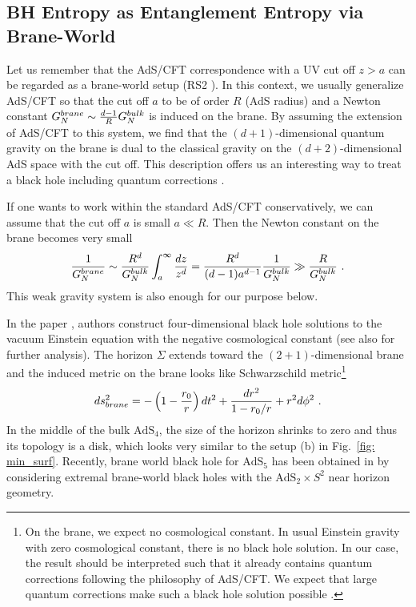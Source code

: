\documentclass[12pt]{article}
\def\frac#1#2{{#1\over #2}}
\def\f {\frac}
\def\frac#1#2{{#1\over #2}}
\def\be{\begin{equation}}
\def\ee{\end{equation}}
\begin{document}
\subsection{BH Entropy as Entanglement Entropy via Brane-World}\label{secbh}
\hspace{5mm}
Let us remember that the AdS/CFT correspondence with a UV cut off $z>a$ can
be regarded as a brane-world setup (RS2 \cite{RS}).
In this context, we usually generalize AdS/CFT
so that the cut off $a$ to be of order $R$ (AdS radius) and
a Newton constant $G^{brane}_{N}\sim\f{d-1}{R}G^{bulk}_{N}$  is induced on the brane. By assuming the extension
of AdS/CFT to this system, we find that the $(d+1)$-dimensional quantum gravity on the brane
is dual to the classical gravity on the $(d+2)$-dimensional AdS space with the cut off.
This description offers us an interesting way to treat a black hole including
quantum corrections \cite{EHM}.

If one wants to work within the standard AdS/CFT conservatively, we can assume that the cut off $a$ is small
$a\ll R$. Then the Newton constant on the brane becomes very small
\begin{equation}
  \frac{1}{G^{brane}_N}\sim \frac{R^d}{G^{bulk}_{N}}\int^\infty_a
    \frac{dz}{z^{d}}=\frac{R^d}{(d-1)a^{d-1}}\frac{1}{G^{bulk}_{N}}\gg
    \frac{R}{G^{bulk}_{N}}\ .  \label{weakg}
\end{equation}
This weak gravity system is also enough for our purpose below.

In the paper \cite{EHM}, authors construct four-dimensional black
hole solutions to the vacuum Einstein equation with the negative
cosmological constant (see also \cite{Anber} for further analysis).
The horizon $\Sigma$ extends toward the $(2+1)$-dimensional brane
and the induced
 metric on the brane looks like
Schwarzschild metric\footnote{On the brane, we expect no cosmological constant.
In usual Einstein gravity with zero cosmological constant, there is no black hole solution.
In our case, the result should be interpreted such that it already contains quantum corrections following
the philosophy of AdS/CFT. We expect that large quantum corrections make such a black hole solution
possible \cite{EHM}.}
\be
ds^2_{brane}=-\left(1-\f{r_0}{r}\right)dt^2+\f{dr^2}{1-r_0/r}+r^2
d\phi^2\ .
\ee
In the middle of the bulk $\mathrm{AdS}_4$,
the size of the horizon shrinks to zero
and thus its topology is a disk, which looks very similar to
the setup (b) in Fig.\ \ref{fig: min_surf}. Recently, brane world black hole for
$\mathrm{AdS}_5$ has been obtained
in \cite{KaRe} by considering extremal brane-world black holes with the
$\mathrm{AdS}_2\times S^2$ near
horizon geometry.
\end{document}
